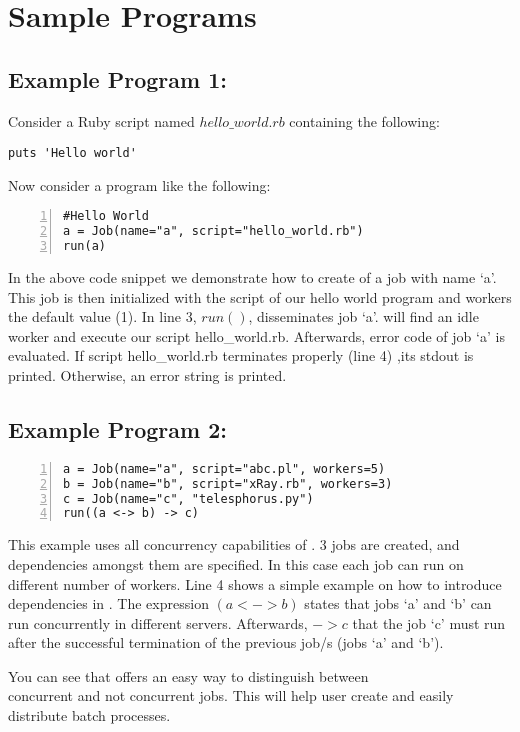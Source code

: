 \section{Sample Programs}
\label{sect:samples}
\subsection*{Example Program 1:}
Consider a Ruby script named $hello\_world.rb$ containing the following:
\begin{verbatim}
puts 'Hello world'
\end{verbatim}
Now consider a \lang{} program like the following:
\begin{Verbatim}[numbers=left]
#Hello World
a = Job(name="a", script="hello_world.rb")
run(a)
\end{Verbatim}

In the above code snippet we demonstrate how to create of a job with name `a'.
This job is then initialized with the script of our hello world program and
workers the default value (1). In line 3, $run()$, disseminates job `a'. 
\lang{} will find an idle worker and execute our script hello\_world.rb.
Afterwards, error code of job `a' is evaluated. If script hello\_world.rb terminates properly (line 4)
,its stdout is printed. Otherwise, an error string is printed.

\subsection*{Example Program 2:}
\begin{Verbatim}[numbers=left]
a = Job(name="a", script="abc.pl", workers=5)
b = Job(name="b", script="xRay.rb", workers=3)
c = Job(name="c", "telesphorus.py")
run((a <-> b) -> c)
\end{Verbatim}

This example uses all concurrency capabilities of \lang{}.
3 jobs are created, and dependencies amongst them are specified.
In this case each job can run on different number of workers.
Line 4  shows a simple example on how to introduce dependencies in \lang{}.
The expression $(a <-> b)$ states that jobs `a' and `b' can
run concurrently in different servers. Afterwards,  $-> c$ that the job `c' must run after the successful termination
of the previous job/s (jobs `a' and `b').

You can see that \lang{} offers an easy way to distinguish between\\
concurrent and not concurrent jobs. This will help user create and easily distribute batch processes.\\
\\

